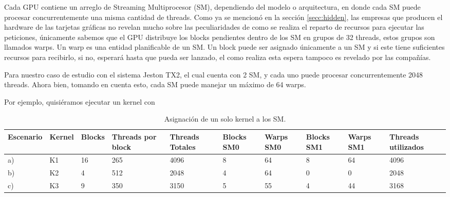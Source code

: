 Cada GPU contiene un arreglo de Streaming Multiprocesor (SM), dependiendo del modelo o arquitectura, en donde cada SM puede procesar concurrentemente una misma cantidad de threads. Como ya se mencionó en la sección \ref{secc:hidden}, las empresas que producen el hardware de las tarjetas gráficas no revelan mucho sobre las peculiaridades de como se realiza el reparto de recursos para ejecutar las peticiones, únicamente sabemos que el GPU distribuye los blocks pendientes dentro de los SM en grupos de 32 threads, estos grupos son llamados warps. Un warp es una entidad planificable de un SM.
Un block puede ser asignado únicamente a un SM y si este tiene suficientes recursos para recibirlo, si no, esperará hasta que pueda ser lanzado, el como realiza esta espera tampoco es revelado por las compañías.
\newline

Para nuestro caso de estudio con el sistema Jeston TX2, el cual cuenta con 2 SM, y cada uno puede procesar concurrentemente 2048 threads. Ahora bien, tomando en cuenta esto, cada SM puede manejar un máximo de 64 warps.

Por ejemplo, quisiéramos ejecutar un kernel con  


  \begin{table}[h!]
      \begin{center}
            \scriptsize
        \begin{tabular}{|m{1.5cm}|m{1cm}|m{1cm}|m{1.5cm}|m{1.5cm}|m{1cm}|m{1cm}|m{1cm}|m{1cm}|m{1.5cm}|}
         \hline
         \cellcolor{lightgray}\textbf{Escenario} &
         \cellcolor{lightgray}\textbf{Kernel} & 
         \cellcolor{lightgray}\textbf{Blocks} &
         \cellcolor{lightgray}\textbf{Threads por block} &
         \cellcolor{lightgray}\textbf{Threads Totales} &
         \cellcolor{lightgray}\textbf{Blocks SM0} &
         \cellcolor{lightgray}\textbf{Warps SM0} &
         \cellcolor{lightgray}\textbf{Blocks SM1} &
         \cellcolor{lightgray}\textbf{Warps SM1} &
         \cellcolor{lightgray}\textbf{Threads utilizados}\\ 
         \hline
         a) & K1 & 16 & 265 & 4096 & 8 & 64 & 8 & 64 & 4096\\ 
         \hline
         b) & K2 & 4 & 512 & 2048 & 4 & 64 & 0 & 0 & 2048\\ 
         \hline
         c) & K3 & 9 & 350 & 3150 & 5 & 55 & 4 & 44 & 3168\\ 
         \hline
           \end{tabular}
        \caption{Asignación de un solo kernel a los SM.}
        \label{tab:asigUnKernelSM}
      \end{center}
    \end{table}
    

